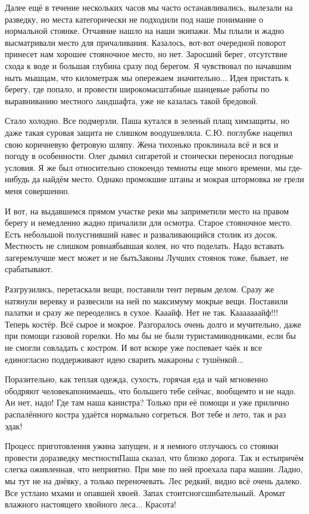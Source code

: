 Далее ещё в течение нескольких часов мы часто останавливались, вылезали на разведку, но места категорически не подходили под наше понимание о нормальной стоянке. Отчаяние нашло на наши экипажи. Мы плыли и жадно высматривали место для причаливания. Казалось, вот-вот очередной поворот принесет нам хорошее стояночное место, но нет. Заросший берег, отсутствие схода к воде и большая глубина сразу под берегом. Я чувствовал по начавшим ныть мышцам, что километраж мы опережаем значительно$\ldots$ Идея пристать к берегу, где попало, и провести широкомасштабные шанцевые работы по выравниванию местного ландшафта, уже не казалась такой бредовой.

Стало холодно. Все подмерзли. Паша кутался в зеленый плащ химзащиты, но даже такая суровая защита не слишком воодушевляла. С.Ю. поглубже нацепил свою коричневую фетровую шляпу. Жена тихонько проклинала всё и вся и погоду в особенности. Олег дымил сигаретой и стоически переносил погодные условия. Я же был относительно спокоен\mdash до темноты еще много времени, мы где-нибудь да найдём место. Однако промокшие штаны и мокрая штормовка не грели меня совершенно.

И вот, на выдавшемся прямом участке реки мы заприметили место на правом берегу и немедленно жадно причалили для осмотра. Старое стояночное место. Есть небольшой полусгнивший навес и разваливающийся столик из досок. Местность не слишком ровная\mdash бывшая колея, но что поделать. Надо вставать лагерем\mdash лучше мест может и не быть\mdash Законы Лучших стоянок тоже, бывает, не срабатывают.

Разгрузились, перетаскали вещи, поставили тент первым делом. Сразу же натянули веревку и развесили на ней по максимуму мокрые вещи. Поставили палатки и сразу же переоделись в сухое. Ка\sdash а\sdash айф. Нет не так. К\sdash а\sdash а\sdash а\sdash а\sdash а\sdash а\sdash айф!!! Теперь костёр. Всё сырое и мокрое. Разгоралось очень долго и мучительно, даже при помощи газовой горелки. Но мы бы не были туристами\sdash водниками, если бы не смогли совладать с костром. И вот вскоре уже поспевает чаёк и все единогласно поддерживают идею сварить макароны с тушёнкой$\ldots$

Поразительно, как теплая одежда, сухость, горячая еда и чай мгновенно ободряют человека\mdash понимаешь, что большего тебе сейчас, вообщем\sdash то и не надо. Ан нет, надо! Где там наша канистра? Только при её помощи и уже прилично распалённого костра удаётся нормально согреться. Вот тебе и лето, так и раз эдак! 
 
Процесс приготовления ужина запущен, и я немного отлучаюсь со стоянки провести доразведку местности\mdash Паша сказал, что близко дорога. Так и есть\mdash причём слегка оживленная, что неприятно. При мне по ней проехала пара машин. Ладно, мы тут не на днёвку, а только переночевать. Лес редкий, видно всё очень далеко. Все устлано мхами и опавшей хвоей. Запах стоит\mdash сногсшибательный. Аромат влажного настоящего хвойного леса$\ldots$ Красота!

